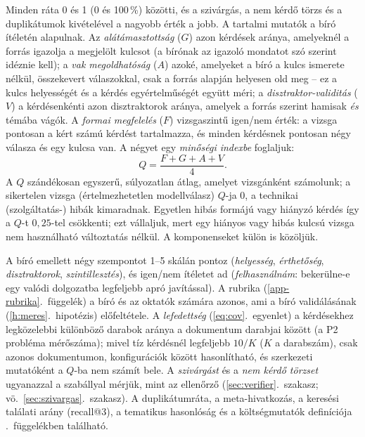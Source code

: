 Minden ráta 0 és 1 (0 és 100\,\%) közötti, és a szivárgás, a nem kérdő törzs és a duplikátumok
kivételével a nagyobb érték a jobb. A tartalmi mutatók a bíró ítéletén alapulnak. Az
\emph{alátámasztottság} ($G$) azon kérdések aránya, amelyeknél a forrás igazolja a megjelölt kulcsot (a
bírónak az igazoló mondatot szó szerint idéznie kell); a \emph{vak megoldhatóság} ($A$) azoké, amelyeket a
bíró a kulcs ismerete nélkül, összekevert válaszokkal, csak a forrás alapján helyesen old meg -- ez a kulcs
helyességét és a kérdés egyértelműségét együtt méri; a \emph{disztraktor-validitás} ($V$) a kérdésenkénti
azon disztraktorok aránya, amelyek a forrás szerint hamisak \emph{és} témába vágók. A \emph{formai
megfelelés} ($F$) vizsgaszintű igen/nem érték: a vizsga pontosan a kért számú kérdést tartalmazza, és
minden kérdésnek pontosan négy válasza és egy kulcsa van. A négyet egy \emph{minőségi indexbe} foglaljuk:
\begin{equation}
Q=\frac{F+G+A+V}{4}.
\label{eq:qindex}
\end{equation}
A $Q$ szándékosan egyszerű, súlyozatlan átlag, amelyet vizsgánként számolunk; a sikertelen vizsga
(értelmezhetetlen modellválasz) $Q$-ja 0, a technikai (szolgáltatás-) hibák kimaradnak. Egyetlen hibás
formájú vagy hiányzó kérdés így a $Q$-t $0{,}25$-tel csökkenti; ezt vállaljuk, mert egy hiányos vagy hibás
kulcsú vizsga nem használható változtatás nélkül. A komponenseket külön is közöljük.

A bíró emellett négy szempontot 1--5 skálán pontoz (\emph{helyesség}, \emph{érthetőség},
\emph{disztraktorok}, \emph{szintillesztés}), és igen/nem ítéletet ad (\emph{felhasználnám}: bekerülne-e
egy valódi dolgozatba legfeljebb apró javítással). A rubrika (\ref{app-rubrika}.~függelék) a bíró és az
oktatók számára azonos, ami a bíró validálásának (\ref{h:meres}.~hipotézis) előfeltétele. A
\emph{lefedettség} (\ref{eq:cov}.~egyenlet) a kérdésekhez legközelebbi különböző darabok aránya a
dokumentum darabjai között (a P2 probléma mérőszáma); mivel tíz kérdésnél legfeljebb $10/K$ ($K$ a
darabszám), csak azonos dokumentumon, konfigurációk között hasonlítható, és szerkezeti mutatóként a $Q$-ba
nem számít bele. A \emph{szivárgást} és a \emph{nem kérdő törzset} ugyanazzal a szabállyal mérjük, mint az
ellenőrző (\ref{sec:verifier}.~szakasz; vö.\ \ref{sec:szivargas}.~szakasz). A duplikátumráta, a
meta-hivatkozás, a keresési találati arány (recall@3), a tematikus hasonlóság és a költségmutatók
definíciója \az{\ref{app-mutatok}}.~függelékben található.

